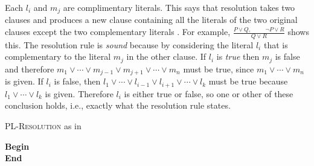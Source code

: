 Each $l_i$ and $m_j$ are complimentary literals. This says that resolution takes two clauses and
produces a new clause containing all the literals of the two original clauses except the two
complementary literals \citep{russell2016artificial}. For example, $\frac{P \vee Q, \hspace{1cm} \neg P \vee R}{Q\vee R}$ shows this. The resolution rule is \textit{sound} because by considering the literal $l_i$ that is complementary to the literal $m_j$ in the other clause. If $l_i$ is \textit{true} then $m_j$ is false and therefore  $m_1 \vee \cdots \vee m_{j-1} \vee m_{j+1} \vee \cdots \vee m_n $ must be true, since $m_1\vee\cdots\vee m_n$ is given. If $l_i$ is false, then $l_1 \vee \cdots \vee l_{i-1} \vee l_{i+1} \vee \cdots \vee l_k$ must be true because $l_1 \vee \cdots \vee l_k$ is given. Therefore $l_i$ is either true or false, so one or other of these conclusion holds, i.e., exactly what the resolution rule states.

\vspace{0.5cm}
\begin{algorithm}[H]
\label{algorithm:resolution}
\caption{\textsc{PL-Resolution} as in \citep{russell2016artificial}}
\SetAlgoLined
\DontPrintSemicolon
{}
\textbf{Begin} \\
\Indm 
\textbf{End}   \\
\end{algorithm}
\vspace{0.5cm}

